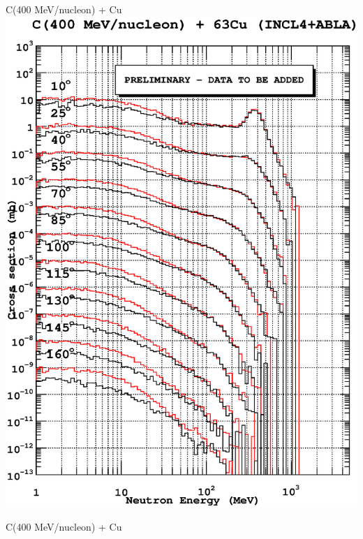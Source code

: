 \documentclass[20pt]{article}
\newenvironment{textbox}
{\begin{lrbox}{\dummybox}\begin{minipage}{0.9\columnwidth}}
{\end{minipage}\end{lrbox}\raisebox{-\depth}{\psshadowbox[framesep=1em,framearc=.1,shadow=true]{\usebox{\dummybox}}}\vspace{0.005\textheight}}
\begin{document}
\begin{center}
\begin{multicols}{3}
\begin{textbox}
{\begin{center}
{\Huge {\sf C(400 MeV/nucleon) + Cu}}
\includegraphics[scale=0.6,angle=0]{images/carbonCopper.eps}
\end{center}
\begin{center}
{\Huge {\sf C(400 MeV/nucleon) + Cu}}

\end{center}}
\end{textbox}
\end{multicols}
\end{center}
\end{document}
